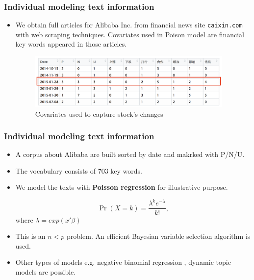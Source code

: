 \documentclass{beamer}
\begin{document}
\begin{frame}
  \frametitle{Individual modeling text information}

  \begin{itemize}
  \item We obtain full articles for Alibaba Inc. from financial news site
    {\color{blue} \texttt{caixin.com}} with web scraping techniques. Covariates
    used in Poison model are financial key words appeared in those articles.


    \begin{figure}
      \centering
      \includegraphics[width=0.95\textwidth]{plot/TextsCovs-New}
      \caption{Covariates used to capture stock's changes}
    \end{figure}
  \end{itemize}

\end{frame}




\begin{frame}
  \frametitle{Individual modeling text information}
  \begin{itemize}
  \item A corpus about Alibaba are built sorted by date and makrked with P/N/U.
  \item The vocabulary consists of 703 key words.

  \item We model the texts with \textbf{Poisson regression} for illustrative purpose.

    \begin{equation*}
      \Pr(X{=}k)= \frac{\lambda^k e^{-\lambda}}{k!},
    \end{equation*}
    where $\lambda = exp(x'\beta)$

  \item This is an $n<p$ problem. An efficient Bayesian variable selection algorithm is
    used.

  \item Other types of models e.g. negative binomial regression
    , dynamic topic models  are
    possible.
  \end{itemize}

\end{frame}
\end{document}
